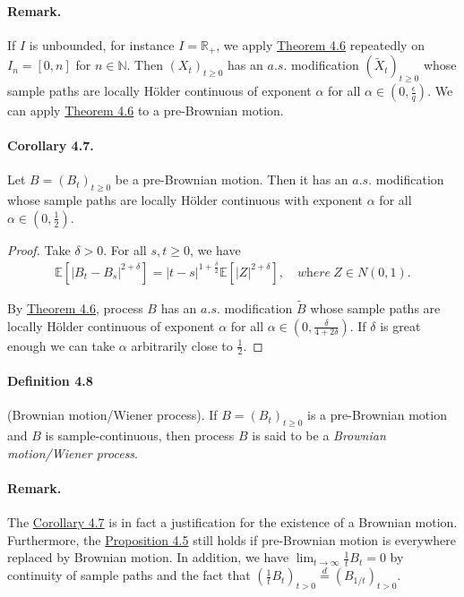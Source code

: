 \documentclass{article}
\numberwithin{equation}{section}
\newcommand{\E}{\mathbb{E}}
\theoremstyle{plain}
\theoremstyle{definition}
\begin{document}
\paragraph{Remark.} If $I$ is unbounded, for instance $I=\mathbb{R}_+$, we apply \hyperref[thm:4.6]{Theorem 4.6} repeatedly on $I_n=[0,n]$ for $n\in\mathbb{N}$. Then $(X_t)_{t\geq 0}$ has an $a.s.$ modification $(\widetilde{X}_t)_{t\geq 0}$ whose sample paths are locally Hölder continuous of exponent $\alpha$ for all $\alpha\in(0,\frac{\epsilon}{q})$. We can apply \hyperref[thm:4.6]{Theorem 4.6} to a pre-Brownian motion.

\paragraph{Corollary 4.7.\label{cor:4.7}} Let $B=(B_t)_{t\geq 0}$ be a pre-Brownian motion. Then it has an $a.s.$ modification whose sample paths are locally Hölder continuous with exponent $\alpha$ for all $\alpha\in(0,\frac{1}{2})$.
\begin{proof}
Take $\delta>0$. For all $s,t\geq 0$, we have
\begin{align*}
	\E\left[\vert B_t-B_s\vert^{2+\delta}\right]=\vert t-s\vert^{1+\frac{\delta}{2}}\E\left[\vert Z\vert^{2+\delta}\right],\quad \textit{where}\ Z\in N(0,1).
\end{align*}

By \hyperref[thm:4.6]{Theorem 4.6}, process $B$ has an $a.s.$ modification $\widetilde{B}$ whose sample paths are locally Hölder continuous of exponent $\alpha$ for all $\alpha\in(0,\frac{\delta}{4+2\delta})$. If $\delta$ is great enough we can take $\alpha$ arbitrarily close to $\frac{1}{2}$.
\end{proof}

\paragraph{Definition 4.8\label{def:4.8}} (Brownian motion/Wiener process). If $B=(B_t)_{t\geq 0}$ is a pre-Brownian motion and $B$ is sample-continuous, then process $B$ is said to be a \textit{Brownian motion/Wiener process}.

\paragraph{Remark.} The \hyperref[cor:4.7]{Corollary 4.7} is in fact a justification for the existence of a Brownian motion. Furthermore, the \hyperref[prop:4.5]{Proposition 4.5} still holds if pre-Brownian motion is everywhere replaced by Brownian motion. In addition, we have $\lim_{t\to\infty}\frac{1}{t}B_t=0$ by continuity of sample paths and the fact that $(\frac{1}{t}B_t)_{t>0}\overset{d}{=}(B_{1/t})_{t>0}$.
\end{document}
